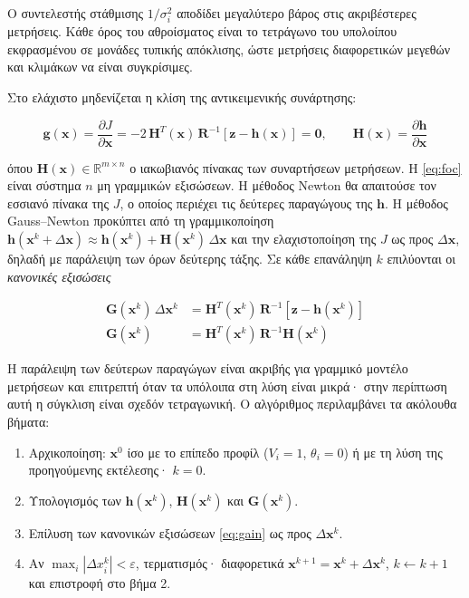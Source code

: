 Ο συντελεστής στάθμισης $1/\sigma_i^2$ αποδίδει μεγαλύτερο βάρος στις ακριβέστερες μετρήσεις.
Κάθε όρος του αθροίσματος είναι το τετράγωνο του υπολοίπου εκφρασμένου σε μονάδες τυπικής
απόκλισης, ώστε μετρήσεις διαφορετικών μεγεθών και κλιμάκων να είναι συγκρίσιμες.

Στο ελάχιστο μηδενίζεται η κλίση της αντικειμενικής συνάρτησης:

\begin{equation}
\mathbf{g}(\mathbf{x}) = \frac{\partial J}{\partial \mathbf{x}}
  = -2\,\mathbf{H}^{T}(\mathbf{x})\,\mathbf{R}^{-1}\left[\mathbf{z} - \mathbf{h}(\mathbf{x})\right]
  = \mathbf{0}, \qquad
\mathbf{H}(\mathbf{x}) = \frac{\partial \mathbf{h}}{\partial \mathbf{x}}
\label{eq:foc}
\end{equation}

όπου $\mathbf{H}(\mathbf{x}) \in \mathbb{R}^{m \times n}$ ο ιακωβιανός πίνακας των συναρτήσεων
μετρήσεων. Η \eqref{eq:foc} είναι σύστημα $n$ μη γραμμικών εξισώσεων. Η μέθοδος Newton θα
απαιτούσε τον εσσιανό πίνακα της $J$, ο οποίος περιέχει τις δεύτερες παραγώγους της
$\mathbf{h}$. Η μέθοδος Gauss--Newton προκύπτει από τη γραμμικοποίηση
$\mathbf{h}(\mathbf{x}^{k} + \Delta\mathbf{x}) \approx \mathbf{h}(\mathbf{x}^{k}) +
\mathbf{H}(\mathbf{x}^{k})\,\Delta\mathbf{x}$ και την ελαχιστοποίηση της $J$ ως προς
$\Delta\mathbf{x}$, δηλαδή με παράλειψη των όρων δεύτερης τάξης. Σε κάθε επανάληψη $k$
επιλύονται οι \emph{κανονικές εξισώσεις}

\begin{align}
\mathbf{G}(\mathbf{x}^{k}) \, \Delta \mathbf{x}^{k}
  &= \mathbf{H}^{T}(\mathbf{x}^{k}) \, \mathbf{R}^{-1}
     \left[\mathbf{z} - \mathbf{h}(\mathbf{x}^{k})\right] \\
\mathbf{G}(\mathbf{x}^{k})
  &= \mathbf{H}^{T}(\mathbf{x}^{k}) \, \mathbf{R}^{-1} \mathbf{H}(\mathbf{x}^{k})
\label{eq:gain}
\end{align}

Η παράλειψη των δεύτερων παραγώγων είναι ακριβής για γραμμικό μοντέλο μετρήσεων και
επιτρεπτή όταν τα υπόλοιπα στη λύση είναι μικρά· στην περίπτωση αυτή η σύγκλιση είναι σχεδόν
τετραγωνική. Ο αλγόριθμος περιλαμβάνει τα ακόλουθα βήματα:

\begin{enumerate}
\item Αρχικοποίηση: $\mathbf{x}^{0}$ ίσο με το επίπεδο προφίλ ($V_i = 1$, $\theta_i = 0$) ή
      με τη λύση της προηγούμενης εκτέλεσης· $k = 0$.
\item Υπολογισμός των $\mathbf{h}(\mathbf{x}^{k})$, $\mathbf{H}(\mathbf{x}^{k})$ και
      $\mathbf{G}(\mathbf{x}^{k})$.
\item Επίλυση των κανονικών εξισώσεων \eqref{eq:gain} ως προς $\Delta\mathbf{x}^{k}$.
\item Αν $\max_i |\Delta x_i^{k}| < \varepsilon$, τερματισμός· διαφορετικά
      $\mathbf{x}^{k+1} = \mathbf{x}^{k} + \Delta\mathbf{x}^{k}$, $k \leftarrow k + 1$ και
      επιστροφή στο βήμα 2.
\end{enumerate}

